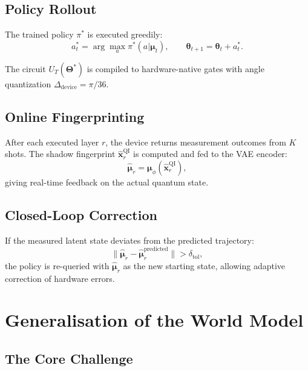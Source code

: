 \documentclass[11pt,a4paper]{article}
\begin{document}
\subsection{Policy Rollout}

The trained policy $\pi^*$ is executed greedily:
\begin{equation}
    a_t^* = \arg\max_a \pi^*(a | \boldsymbol{\mu}_t),
    \qquad
    \boldsymbol{\theta}_{t+1} = \boldsymbol{\theta}_t + a_t^*.
\end{equation}

The circuit $U_T(\boldsymbol{\Theta}^*)$ is compiled to hardware-native gates with
angle quantization $\Delta_{\mathrm{device}} = \pi/36$.

\subsection{Online Fingerprinting}

After each executed layer $r$, the device returns measurement outcomes from $K$ shots.
The shadow fingerprint $\hat{\mathbf{x}}_r^{\mathrm{QI}}$ is computed and fed to the
VAE encoder:
\begin{equation}
    \hat{\boldsymbol{\mu}}_r = \boldsymbol{\mu}_\phi\!\left(\hat{\mathbf{x}}_r^{\mathrm{QI}}\right),
\end{equation}
giving real-time feedback on the actual quantum state.

\subsection{Closed-Loop Correction}

If the measured latent state deviates from the predicted trajectory:
\begin{equation}
    \|\hat{\boldsymbol{\mu}}_r - \hat{\boldsymbol{\mu}}_r^{\mathrm{predicted}}\| > \delta_{\mathrm{tol}},
\end{equation}
the policy is re-queried with $\hat{\boldsymbol{\mu}}_r$ as the new starting state,
allowing adaptive correction of hardware errors.

\section{Generalisation of the World Model}\label{sec:generalisation}

\subsection{The Core Challenge}
\end{document}
